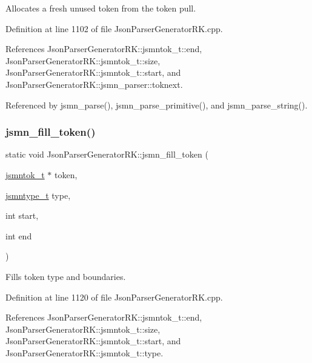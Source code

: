 Allocates a fresh unused token from the token pull. 

Definition at line 1102 of file Json\+Parser\+Generator\+R\+K.\+cpp.



References Json\+Parser\+Generator\+R\+K\+::jsmntok\+\_\+t\+::end, Json\+Parser\+Generator\+R\+K\+::jsmntok\+\_\+t\+::size, Json\+Parser\+Generator\+R\+K\+::jsmntok\+\_\+t\+::start, and Json\+Parser\+Generator\+R\+K\+::jsmn\+\_\+parser\+::toknext.



Referenced by jsmn\+\_\+parse(), jsmn\+\_\+parse\+\_\+primitive(), and jsmn\+\_\+parse\+\_\+string().

\mbox{\label{namespace_json_parser_generator_r_k_a2b59144adb776aecb8bf1ad705aad7f5}} 
\subsubsection{\texorpdfstring{jsmn\+\_\+fill\+\_\+token()}{jsmn\_fill\_token()}}
{\footnotesize\ttfamily static void Json\+Parser\+Generator\+R\+K\+::jsmn\+\_\+fill\+\_\+token (\begin{DoxyParamCaption}\item[{\hyperlink{struct_json_parser_generator_r_k_1_1jsmntok__t}{jsmntok\+\_\+t} $\ast$}]{token,  }\item[{\hyperlink{namespace_json_parser_generator_r_k_a45d8af9d310679633d258ed9b2caeeb3}{jsmntype\+\_\+t}}]{type,  }\item[{int}]{start,  }\item[{int}]{end }\end{DoxyParamCaption})\hspace{0.3cm}{\ttfamily [static]}}

Fills token type and boundaries. 

Definition at line 1120 of file Json\+Parser\+Generator\+R\+K.\+cpp.



References Json\+Parser\+Generator\+R\+K\+::jsmntok\+\_\+t\+::end, Json\+Parser\+Generator\+R\+K\+::jsmntok\+\_\+t\+::size, Json\+Parser\+Generator\+R\+K\+::jsmntok\+\_\+t\+::start, and Json\+Parser\+Generator\+R\+K\+::jsmntok\+\_\+t\+::type.



